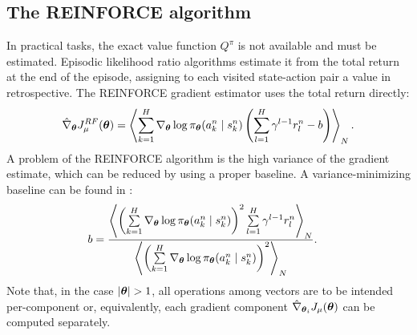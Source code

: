 \subsection{The REINFORCE algorithm}
In practical tasks, the exact value function $Q^{\pi}$ is not available and must be estimated. Episodic likelihood ratio algorithms estimate it from the total return at the end of the episode, assigning to each visited state-action pair a value in retrospective. The REINFORCE gradient estimator \cite{Williams1992} uses the total return directly:
\[
	\hat{\nabla}_{\boldsymbol{\theta}}J_{\mu}^{RF}(\boldsymbol{\theta}) = 
		\left\langle
		\sum\limits_{k=1}^H\nabla_{\boldsymbol{\theta}}\log\pi_{\boldsymbol{\theta}}(a_k^n \mid s_k^n)
		\left(\sum\limits_{l=1}^H\gamma^{l-1}r_l^n-b\right)\right\rangle_N.
\]
A problem of the REINFORCE algorithm is the high variance of the gradient estimate, which can be reduced by using a proper baseline. A variance-minimizing baseline can be found in \cite{Peters2008reinf}:
\begin{align*}
	b &= \frac{\left\langle\left(\sum\limits_{k=1}^H\nabla_{\boldsymbol{\theta}}\log\pi_{\boldsymbol{\theta}}(a_k^n \mid s_k^n)\right)^2
		\sum\limits_{l=1}^H\gamma^{l-1}r_l^n\right\rangle_N}
		{\left\langle\left(\sum\limits_{k=1}^H\nabla_{\boldsymbol{\theta}}\log\pi_{\boldsymbol{\theta}}(a_k^n \mid s_k^n)\right)^2
		\right\rangle_N}.
\end{align*}
Note that, in the case $|\vtheta|>1$, all operations among vectors are to be intended per-component or, equivalently, each gradient component $\hat{\nabla}_{\boldsymbol{\theta}_i}J_{\mu}(\boldsymbol{\theta})$ can be computed separately.


